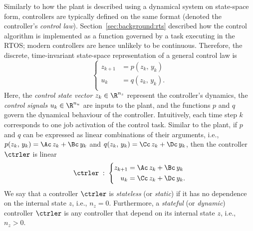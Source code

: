 Similarly to how the plant is described using a dynamical system on state-space form, controllers are typically defined on the same format (denoted the controller's \emph{control law}).
Section~\ref{sec:background:rts} described how the control algorithm is implemented as a function governed by a task executing in the RTOS; modern controllers are hence unlikely to be continuous.
Therefore, the discrete, time-invariant state-space representation of a general control law is
%
\begin{equation}%
    \label{eq:discrete-state-space}%
    \left\{\begin{aligned}
        z_{k+1} &= p(z_k,\, y_k) \\
        u_k &= q(z_k,\, y_k). \\
    \end{aligned}\right.
\end{equation}
%
Here, the \emph{control state vector} $z_k \in \R^{n_z}$ represent the controller's dynamics, the \emph{control signals} $u_k \in \R^{n_u}$ are inputs to the plant, and the functions $p$ and $q$ govern the dynamical behaviour of the controller.
Intuitively, each time step $k$ corresponds to one job activation of the control task.
Similar to the plant, if $p$ and $q$ can be expressed as linear combinations of their arguments, i.e., $p(z_k,\, y_k) = \Ac\,z_k+\Bc\,y_k$ and $q(z_k,\, y_k) = \Cc\,z_k+\Dc\,y_k$, then the controller $\ctrler$ is linear
%
\begin{equation}%
    \label{eq:discrete-lti-ctrler}%
    \ctrler \; : \; \left\{\begin{aligned}
        z_{k+1} &= \Ac\,z_k + \Bc\,y_k \\
        u_k &= \Cc\,z_k + \Dc\,y_k. \\
    \end{aligned}\right.
\end{equation}
%
We say that a controller $\ctrler$ is \emph{stateless} (or \emph{static}) if it has no dependence on the internal state $z$, i.e., $n_z = 0$.
Furthermore, a \emph{stateful} (or \emph{dynamic}) controller $\ctrler$ is any controller that depend on its internal state $z$, i.e., $n_z > 0$.

